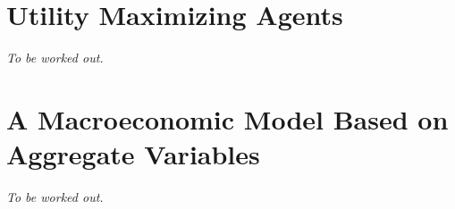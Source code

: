 \documentclass[a4,11pt]{paper}
\begin{document}
\section{Utility Maximizing Agents}
\label{sec:utility}
 {\it To be worked out.}
\section{A Macroeconomic Model Based on Aggregate Variables}
\label{sec:macro}
 {\it To be worked out.}
\end{document}
